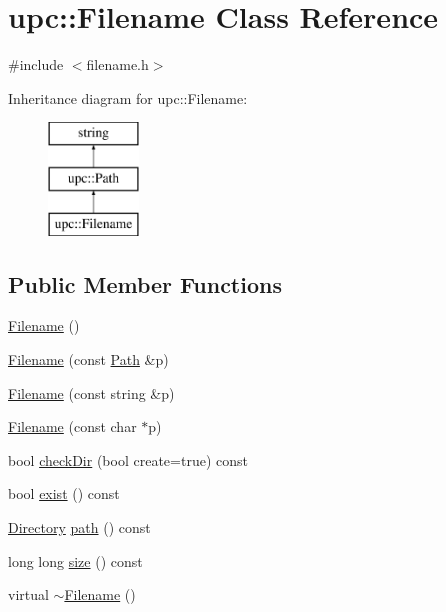 \hypertarget{classupc_1_1Filename}{}\section{upc\+:\+:Filename Class Reference}
\label{classupc_1_1Filename}


{\ttfamily \#include $<$filename.\+h$>$}

Inheritance diagram for upc\+:\+:Filename\+:\begin{figure}[H]
\begin{center}
\leavevmode
\includegraphics[height=3.000000cm]{classupc_1_1Filename}
\end{center}
\end{figure}
\subsection*{Public Member Functions}
\begin{DoxyCompactItemize}
\item 
\hyperlink{classupc_1_1Filename_ab3ba943521dc541e1eed8a3560d4c728}{Filename} ()
\item 
\hyperlink{classupc_1_1Filename_a80bdd15a0d0da8cf97a59125c3cae2c9}{Filename} (const \hyperlink{classupc_1_1Path}{Path} \&p)
\item 
\hyperlink{classupc_1_1Filename_a13e550c5b28bf991c84c053035760ed4}{Filename} (const string \&p)
\item 
\hyperlink{classupc_1_1Filename_a005b26738aa7db3b9f89258600b1e6f3}{Filename} (const char $\ast$p)
\item 
bool \hyperlink{classupc_1_1Filename_a5a53af16ef50db8e0f23ca9e96f6c1d0}{check\+Dir} (bool create=true) const 
\item 
bool \hyperlink{classupc_1_1Filename_af1ea3e760d5dc975dc404b81b3dd495d}{exist} () const 
\item 
\hyperlink{classupc_1_1Directory}{Directory} \hyperlink{classupc_1_1Filename_a5bef869d9bf781b7fbdc7e6e4de13558}{path} () const 
\item 
long long \hyperlink{classupc_1_1Filename_a232b2a742810eb8f213644cd367c8905}{size} () const 
\item 
virtual \hyperlink{classupc_1_1Filename_a873dadf99283f10286cb95cf4f951d1d}{$\sim$\+Filename} ()
\end{DoxyCompactItemize}


